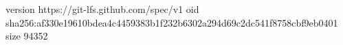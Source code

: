 version https://git-lfs.github.com/spec/v1
oid sha256:af330e19610bdea4c4459383b1f232b6302a294d69c2dc541f8758cbf9eb0401
size 94352
